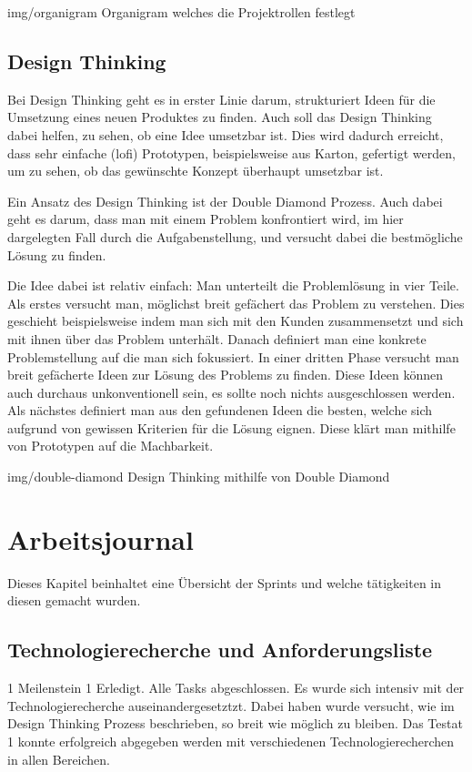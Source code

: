 \image
  {img/organigram}
  {Organigram welches die Projektrollen festlegt}

\subsection{Design Thinking}
\label{sec:design-thinking}

Bei Design Thinking \cite{Wikipedia-Design-Thinking} geht es in erster Linie darum, strukturiert 
Ideen für die Umsetzung eines neuen Produktes zu finden. Auch soll das Design Thinking
dabei helfen, zu sehen, ob eine Idee umsetzbar ist. Dies wird dadurch erreicht,
dass sehr einfache (\acrshort{lofi}) Prototypen, beispielsweise aus Karton, 
gefertigt werden, um zu sehen, ob das gewünschte Konzept überhaupt umsetzbar ist.

Ein Ansatz des Design Thinking ist der Double Diamond Prozess. Auch dabei geht es
darum, dass man mit einem Problem konfrontiert wird, im hier dargelegten Fall durch die 
Aufgabenstellung, und versucht dabei die bestmögliche Lösung zu finden.

Die Idee dabei ist relativ einfach: Man unterteilt die Problemlösung in vier Teile.
Als erstes versucht man, möglichst breit gefächert das Problem zu verstehen. Dies geschieht
beispielsweise indem man sich mit den Kunden zusammensetzt und sich mit ihnen über das Problem unterhält.
Danach definiert man eine konkrete Problemstellung auf die man sich fokussiert.
In einer dritten Phase versucht man breit gefächerte Ideen zur Lösung des Problems zu finden.
Diese Ideen können auch durchaus unkonventionell sein, es sollte noch nichts ausgeschlossen werden.
Als nächstes definiert man aus den gefundenen Ideen
die besten, welche sich aufgrund von gewissen Kriterien für die Lösung eignen.
Diese klärt man mithilfe von Prototypen auf die Machbarkeit.

\image
  {img/double-diamond}
  {Design Thinking mithilfe von Double Diamond}

\section{Arbeitsjournal}

Dieses Kapitel beinhaltet eine Übersicht der Sprints und welche tätigkeiten 
in diesen gemacht wurden.

\subsection*{Technologierecherche und Anforderungsliste}
\workday
    {1}
    {\ok Meilenstein 1 Erledigt. Alle Tasks abgeschlossen.}
    {
      Es wurde sich intensiv mit der Technologierecherche auseinandergesetztzt.
      Dabei haben wurde versucht, wie im Design Thinking Prozess beschrieben, so breit wie möglich
      zu bleiben.
    }
    {
      Das Testat 1 konnte erfolgreich abgegeben werden mit verschiedenen Technologierecherchen in
      allen Bereichen.
    }

